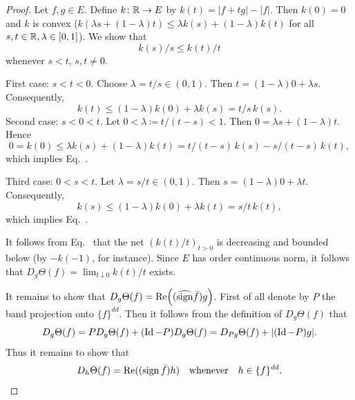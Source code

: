 \begin{proof}
Let $f, g \in E$. Define $k \colon \mathbb{R} \to E$ by $k(t) = |f+tg| - |f|$.
Then $k(0) = 0$ and $k$ is convex (\ie $k(\lambda s + (1-\lambda)t) \leq \lambda k(s) + (1-\lambda)k(t)$ for all $s, t \in \mathbb{R}, \lambda \in [0,1]$).
We show that
\begin{equation}\label{eq:c2-5.7}
k(s)/s \leq k(t)/t
\end{equation}
whenever $s < t$, $s,t \neq 0$.

First case: $s < t < 0$.
Choose $\lambda = t/s \in (0,1)$. 
Then $t = (1-\lambda)0 + \lambda s$. 
Consequently, 
\[
k(t) \leq (1-\lambda)k(0) + \lambda k(s) = t/s \, k(s) .
\]
Second case: $s < 0 < t$.
Let $0 < \lambda \coloneq t/(t-s) < 1$. 
Then $0 = \lambda s + (1-\lambda)t$. 
Hence 
\[
0 = k(0) \leq \lambda k(s) + (1-\lambda)k(t) = t/(t-s) \, k(s) - s/(t-s) \, k(t) ,
\]
which implies Eq.~.

Third case: $0 < s < t$.
Let $\lambda = s/t \in (0,1)$. Then $s = (1-\lambda)0 + \lambda t$. Consequently, 
\[
k(s) \leq (1-\lambda)k(0) + \lambda k(t) = s/t \, k(t) ,
\]
which implies Eq.~.

It follows from Eq.~ that the net $(k(t)/t)_{t>0}$ is decreasing and bounded below (by $-k(-1)$, for instance). Since $E$ has order continuous norm, it follows that $D_{g}\Theta(f) = \lim_{t \downarrow 0} k(t)/t$ exists.

It remains to show that $D_{g}\Theta(f) = \Re\mleft((\widehat{\sign} \bar{f})g\mright)$.
First of all denote by $P$ the band projection onto $\{f\}^{dd}$. Then it
follows from the definition of\/ $D_{g}\Theta(f)$ that 
\[
D_{g}\Theta(f) = PD_{g}\Theta(f) + (\operatorname{Id}-P)D_{g}\Theta(f) = D_{Pg}\Theta(f) + |(\operatorname{Id}-P)g| .
\]
Thus it remains to show that
\begin{equation}\label{eq:c2-5.8}
D_{h}\Theta(f) = \mathop{}\!\mathrm{Re}((\operatorname{sign}  \bar{f})h) \quad \text{whenever} \quad h \in \{f\}^{dd}.
\end{equation}


\end{proof}
